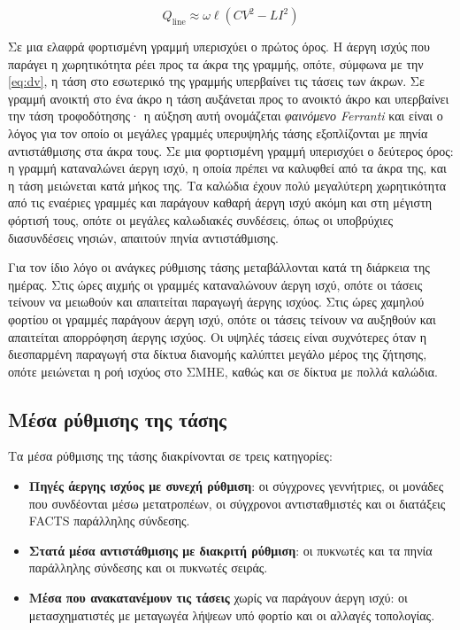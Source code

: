 \begin{equation}
Q_{\mathrm{line}} \approx \omega \ell \left( C V^2 - L I^2 \right)
\label{eq:qline}
\end{equation}

Σε μια ελαφρά φορτισμένη γραμμή υπερισχύει ο πρώτος όρος. Η άεργη ισχύς που παράγει η
χωρητικότητα ρέει προς τα άκρα της γραμμής, οπότε, σύμφωνα με την \eqref{eq:dv}, η τάση στο
εσωτερικό της γραμμής υπερβαίνει τις τάσεις των άκρων. Σε γραμμή ανοικτή στο ένα άκρο η τάση
αυξάνεται προς το ανοικτό άκρο και υπερβαίνει την τάση τροφοδότησης· η αύξηση αυτή ονομάζεται
\emph{φαινόμενο Ferranti} και είναι ο λόγος για τον οποίο οι μεγάλες γραμμές υπερυψηλής τάσης
εξοπλίζονται με πηνία αντιστάθμισης στα άκρα τους. Σε μια φορτισμένη γραμμή υπερισχύει ο
δεύτερος όρος: η γραμμή καταναλώνει άεργη ισχύ, η οποία πρέπει να καλυφθεί από τα άκρα της, και
η τάση μειώνεται κατά μήκος της. Τα καλώδια έχουν πολύ μεγαλύτερη χωρητικότητα από τις εναέριες
γραμμές και παράγουν καθαρή άεργη ισχύ ακόμη και στη μέγιστη φόρτισή τους, οπότε οι μεγάλες
καλωδιακές συνδέσεις, όπως οι υποβρύχιες διασυνδέσεις νησιών, απαιτούν πηνία αντιστάθμισης.

Για τον ίδιο λόγο οι ανάγκες ρύθμισης τάσης μεταβάλλονται κατά τη διάρκεια της ημέρας. Στις
ώρες αιχμής οι γραμμές καταναλώνουν άεργη ισχύ, οπότε οι τάσεις τείνουν να μειωθούν και
απαιτείται παραγωγή άεργης ισχύος. Στις ώρες χαμηλού φορτίου οι γραμμές παράγουν άεργη ισχύ,
οπότε οι τάσεις τείνουν να αυξηθούν και απαιτείται απορρόφηση άεργης ισχύος. Οι υψηλές τάσεις
είναι συχνότερες όταν η διεσπαρμένη παραγωγή στα δίκτυα διανομής καλύπτει μεγάλο μέρος της
ζήτησης, οπότε μειώνεται η ροή ισχύος στο ΣΜΗΕ, καθώς και σε δίκτυα με πολλά καλώδια.

\subsection{Μέσα ρύθμισης της τάσης}
\label{sec:q-sources}

Τα μέσα ρύθμισης της τάσης διακρίνονται σε τρεις κατηγορίες:

\begin{itemize}
\item \textbf{Πηγές άεργης ισχύος με συνεχή ρύθμιση}: οι σύγχρονες γεννήτριες, οι μονάδες που
      συνδέονται μέσω μετατροπέων, οι σύγχρονοι αντισταθμιστές και οι διατάξεις FACTS
      παράλληλης σύνδεσης.
\item \textbf{Στατά μέσα αντιστάθμισης με διακριτή ρύθμιση}: οι πυκνωτές και τα πηνία
      παράλληλης σύνδεσης και οι πυκνωτές σειράς.
\item \textbf{Μέσα που ανακατανέμουν τις τάσεις} χωρίς να παράγουν άεργη ισχύ: οι
      μετασχηματιστές με μεταγωγέα λήψεων υπό φορτίο και οι αλλαγές τοπολογίας.
\end{itemize}

